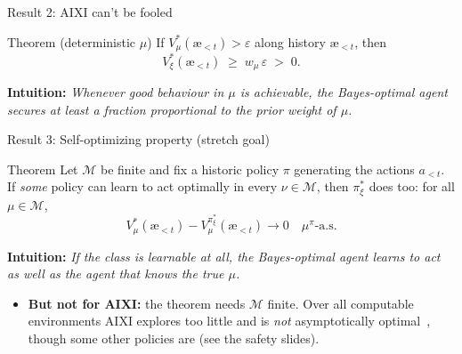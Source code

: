 \documentclass[10pt,aspectratio=169]{beamer}
\newcommand{\cM}{\mathcal{M}}
\newcommand{\aes}{{\text{\ae}}}            %
\begin{document}
\begin{frame}{Result 2: AIXI can't be fooled}
\begin{block}{Theorem (deterministic $\mu$)}
If $V_\mu^*(\aes_{<t}) > \varepsilon$ along history $\aes_{<t}$, then
\[
V_\xi^*(\aes_{<t}) \;\geq\; w_\mu\,\varepsilon \;>\; 0 .
\]
\end{block}
\pause
\textbf{Intuition:} \emph{Whenever good behaviour in $\mu$ is achievable,
the Bayes-optimal agent secures at least a fraction proportional to the prior weight of $\mu$.}
\end{frame}

\begin{frame}{Result 3: Self-optimizing property (stretch goal)}
\begin{block}{Theorem}
Let $\cM$ be finite and fix a historic policy $\pi$ generating the actions $a_{<t}$.
If \emph{some} policy can learn to act optimally in every $\nu\in\cM$, then $\pi_\xi^*$ does too: for all $\mu\in\cM$,
\[
V_\mu^*(\aes_{<t}) - V_\mu^{\pi_\xi^*}(\aes_{<t}) \to 0 \quad \mu^\pi\text{-a.s.}
\]
\end{block}
\pause
\textbf{Intuition:} \emph{If the class is learnable at all, the Bayes-optimal agent learns to act as well as the agent that knows the true $\mu$.}
\pause
\begin{itemize}
    \item \textbf{But not for AIXI:} the theorem needs $\cM$ finite. Over all computable environments AIXI explores too little and is \emph{not} asymptotically optimal~, though some other policies are (see the safety slides).
\end{itemize}
\end{frame}
\end{document}
